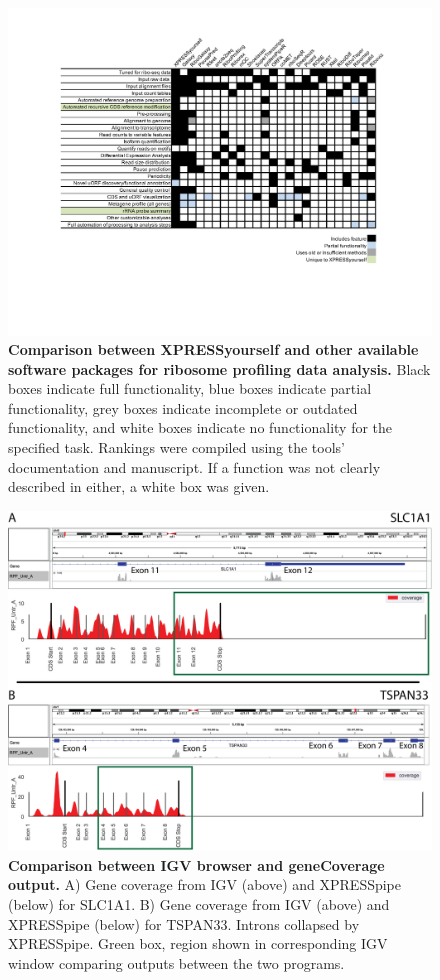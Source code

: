 \documentclass[10pt, oneside]{article}
\begin{document}
\begin{figure}
\centering
  \includegraphics[width=180mm]{figures/xpresspipe_supplement1.png}
  \caption{\textbf{Comparison between XPRESSyourself and other available software packages for ribosome profiling data analysis.} Black boxes indicate full functionality, blue boxes indicate partial functionality, grey boxes indicate incomplete or outdated functionality, and white boxes indicate no functionality for the specified task. Rankings were compiled using the tools' documentation and manuscript. If a function was not clearly described in either, a white box was given.}
  \label{fig:supplement1}
\end{figure}

\begin{figure}
\centering
  \includegraphics[width=160mm]{figures/xpresspipe_supplement2.png}
  \caption{\textbf{Comparison between IGV browser and geneCoverage output.} A) Gene coverage from IGV (above) and XPRESSpipe (below) for SLC1A1. B) Gene coverage from IGV (above) and XPRESSpipe (below) for TSPAN33. Introns collapsed by XPRESSpipe. Green box, region shown in corresponding IGV window comparing outputs between the two programs.}
  \label{fig:supplement2}
\end{figure}
\end{document}
